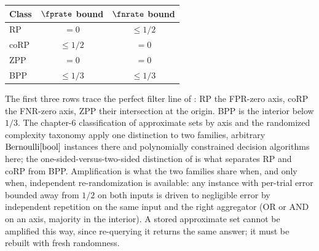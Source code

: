 \begin{center}
\begin{tabular}{lcc}
\hline
\textbf{Class} & $\fprate$ bound & $\fnrate$ bound \\
\hline
RP   & $= 0$       & $\le 1/2$ \\
coRP & $\le 1/2$   & $= 0$ \\
ZPP  & $= 0$       & $= 0$ \\
BPP  & $\le 1/3$   & $\le 1/3$ \\
\hline
\end{tabular}
\end{center}
The first three rows trace the perfect filter line of
: RP the FPR-zero axis, coRP the FNR-zero axis,
ZPP their intersection at the origin. BPP is the interior below $1/3$. The
chapter-6 classification of approximate sets by axis and the randomized
complexity taxonomy apply one distinction to two families, arbitrary
$\mathrm{Bernoulli}[\mathrm{bool}]$ instances there and polynomially constrained decision
algorithms here; the one-sided-versus-two-sided distinction of
 is what separates RP and coRP from BPP.
Amplification is what the two families share when, and only when, independent
re-randomization is available: any instance with per-trial error bounded away
from $1/2$ on both inputs is driven to negligible error by independent repetition
on the same input and the right aggregator (OR or AND on an axis, majority in
the interior). A stored approximate set cannot be amplified this way, since
re-querying it returns the same answer; it must be rebuilt with fresh
randomness.
